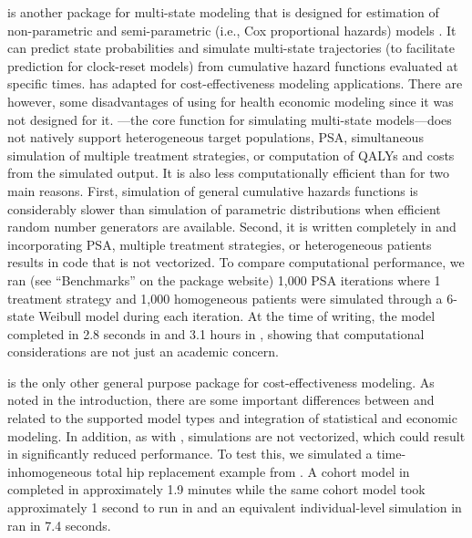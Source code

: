 \documentclass[article, nojss]{jss}\usepackage[]{graphicx}\usepackage[]{color}
\begin{document}
 is another package for multi-state modeling that is designed for estimation of non-parametric and semi-parametric (i.e., Cox proportional hazards) models \citep{de2011mstate}. It can predict state probabilities and simulate multi-state trajectories (to facilitate prediction for clock-reset models) from cumulative hazard functions evaluated at specific times. \citet{williams2017cost} has adapted  for cost-effectiveness modeling applications. There are however, some disadvantages of using  for health economic modeling since it was not designed for it. ---the core function for simulating multi-state models---does not natively support heterogeneous target populations, PSA, simultaneous simulation of multiple treatment strategies, or computation of QALYs and costs from the simulated output. It is also less computationally efficient than  for two main reasons. First, simulation of general cumulative hazards functions is considerably slower than simulation of parametric distributions when efficient random number generators are available. Second, it is written completely in  and incorporating PSA, multiple treatment strategies, or heterogeneous patients results in code that is not vectorized. To compare computational performance, we ran (see ``Benchmarks'' on the package website) 1,000 PSA iterations where 1 treatment strategy and 1,000 homogeneous patients were simulated through a 6-state Weibull model during each iteration. At the time of writing, the model completed in 2.8 seconds in  and 3.1 hours in , showing that computational considerations are not just an academic concern. 

 is the only other general purpose  package for cost-effectiveness modeling. As noted in the introduction, there are some important differences between  and  related to the supported model types and integration of statistical and economic modeling. In addition, as with , simulations are not vectorized, which could result in significantly reduced performance. To test this, we simulated a time-inhomogeneous total hip replacement example from \citet{briggs2006decision}. A cohort model in  completed in approximately 1.9 minutes while the same cohort model took approximately 1 second to run in  and an equivalent individual-level simulation in  ran in 7.4 seconds.
\end{document}
